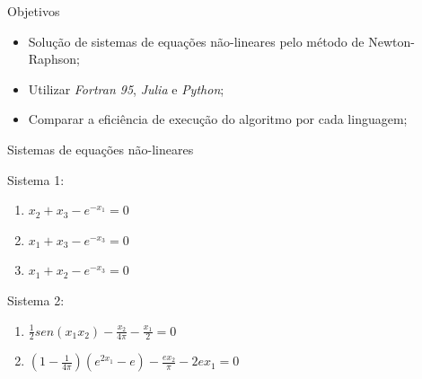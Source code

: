 \documentclass[aspectratio=1610]{beamer}
\begin{document}
\begin{frame}{Objetivos}

\begin{itemize}
 \item Solução de sistemas de equações não-lineares pelo método de Newton-Raphson; \pause
 
 \item Utilizar \textit{Fortran 95}, \textit{Julia} e \textit{Python};\pause
 
 \item Comparar a eficiência de execução do algoritmo por cada linguagem;

\end{itemize}

\end{frame}


\begin{frame}{Sistemas de equações não-lineares}

\begin{block}{Sistema 1:}
 \begin{enumerate}
 \item $ x_2 + x_3 - e^{-x_1} = 0$
 \item $ x_1 + x_3 - e^{-x_3} = 0$
 \item $ x_1 + x_2 - e^{-x_3} = 0$
\end{enumerate}
\end{block}

\begin{block}{Sistema 2:}
 \begin{enumerate}
 \item $ \frac{1}{2}sen(x_1x_2) - \frac{x_2}{4\pi} - \frac{x_1}{2}  = 0$
 \item $ (1-\frac{1}{4\pi})(e^{2x_1}-e) - \frac{ex_2}{\pi} - 2ex_1 = 0$
\end{enumerate}
\end{block}


\end{frame}

\end{document}
